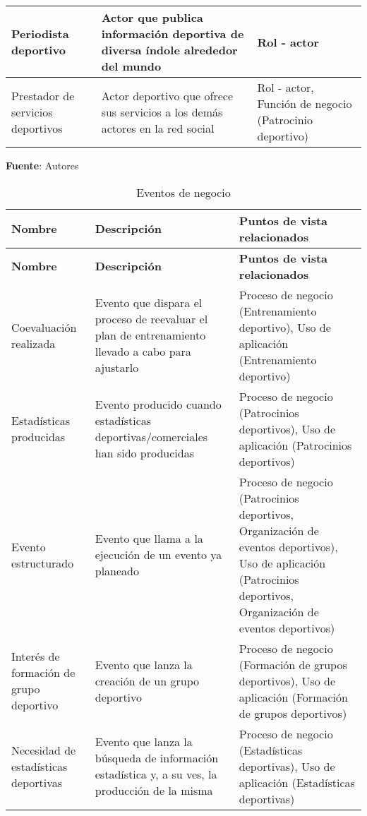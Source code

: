 \begin{center}
\begin{longtable}{|p{4cm}|p{7cm}|p{4cm}|}
		\\
		\hline
		Periodista deportivo &
		Actor que publica información deportiva de diversa índole alrededor del mundo &
		Rol - actor
		\\
		\hline
		Prestador de servicios deportivos &
		Actor deportivo que ofrece sus servicios a los demás actores en la red social &
		Rol - actor, Función de negocio (Patrocinio deportivo)
		\\
		\hline
		\end{longtable}
	\textbf{Fuente}: Autores
\end{center}

\begin{center}
	\begin{longtable}{|p{4cm}|p{7cm}|p{4cm}|}
		\caption{Eventos de negocio \label{tab:eventos_negocio}} \\
		\hline
		\textbf{Nombre} &
		\textbf{Descripción} &
		\textbf{Puntos de vista relacionados} \\
		\hline
		\endfirsthead
		\hline
		\textbf{Nombre} &
		\textbf{Descripción} &
		\textbf{Puntos de vista relacionados} \\
		\hline
		\endhead
		\hline
		\endfoot
		\hline
		\endlastfoot
		Coevaluación realizada & 
		Evento que dispara el proceso de reevaluar el plan de entrenamiento llevado a cabo para ajustarlo & 
		Proceso de negocio (Entrenamiento deportivo), Uso de aplicación (Entrenamiento deportivo)
		\\
		\hline
		Estadísticas producidas & 
		Evento producido cuando estadísticas deportivas/comerciales han sido producidas & 
		Proceso de negocio (Patrocinios deportivos), Uso de aplicación (Patrocinios deportivos)
		\\
		\hline
		Evento estructurado & 
		Evento que llama a la ejecución de un evento ya planeado & 
		Proceso de negocio (Patrocinios deportivos, Organización de eventos deportivos), Uso de aplicación (Patrocinios deportivos, Organización de eventos deportivos)
		\\
		\hline
		Interés de formación de grupo deportivo & 
		Evento que lanza la creación de un grupo deportivo & 
		Proceso de negocio (Formación de grupos deportivos), Uso de aplicación (Formación de grupos deportivos)
		\\
		\hline
		Necesidad de estadísticas deportivas & 
		Evento que lanza la búsqueda de información estadística y, a su ves, la producción de la misma & 
		Proceso de negocio (Estadísticas deportivas), Uso de aplicación (Estadísticas deportivas)
		\\

\end{longtable}
\end{center}
